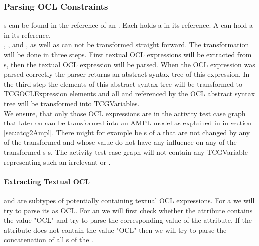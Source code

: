 \subsubsection{Parsing OCL Constraints}
s can be found in the  reference of an . Each  holds a  in its  reference. A  can hold a  in its  reference.\\
, , and , as well as  can not be transformed straight forward. The transformation will be done in three steps. First textual OCL expressions will be extracted from s, then the textual OCL expression will be parsed. When the OCL expression was parsed correctly the parser returns an abstract syntax tree of this expression. In the third step the elements of this abstract syntax tree will be transformed to TCGOCLExpression elements and all  and  referenced by the OCL abstract syntax tree will be transformed into TCGVariables. \\
We ensure, that only those OCL expressions are in the activity test case graph that later on can be transformed into an AMPL model as explained in in section \ref{sec:atcg2Ampl}. There might for example be s of a  that are not changed by any of the transformed  and whose value do not have any influence on any of the transformed s s. The activity test case graph will not contain any TCGVariable representing such an irrelevant  or .
\paragraph{Extracting Textual OCL}
 and  are subtypes of  potentially containing textual OCL expressions. For a  we will try to parse its  as OCL. For an  we will first check whether the  attribute contains the value "OCL" and try to parse the corresponding value of the  attribute. If the  attribute does not contain the value "OCL" then we will try to parse the concatenation of all s of the .
